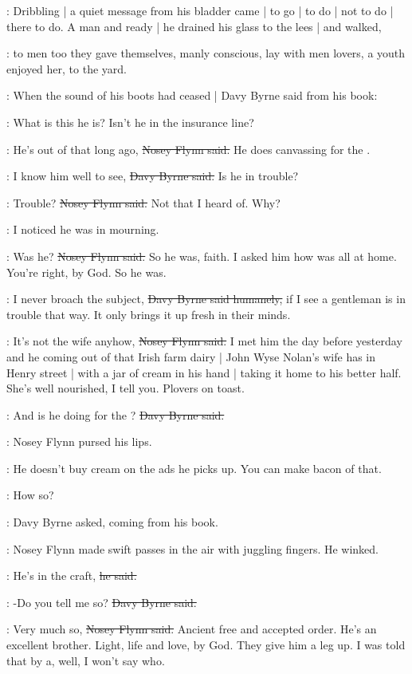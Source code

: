 :
Dribbling |
a quiet message from his bladder came |
to go |
to do |
not to do |
there to do.
A man and ready |
he drained his glass to the lees |
and walked,

:
to men too they gave themselves,
manly conscious,
lay with men lovers,
a youth enjoyed her,
to the yard.

:
When the sound of his boots had ceased |
Davy Byrne said from his book:

\davybyrne:
What is this he is?
Isn't he in the insurance line?

\nosey:
He's out of that long ago,
\sout{Nosey Flynn said.}
He does canvassing for the .

\davybyrne:
I know him well to see,
\sout{Davy Byrne said.}
Is he in trouble?

\nosey:
Trouble?
\sout{Nosey Flynn said.}
Not that I heard of.
Why?

\davybyrne:
I noticed he was in mourning.

\nosey:
Was he?
\sout{Nosey Flynn said.}
So he was, faith.
I asked him how was all at home.
You're right, by God.
So he was.

\davybyrne:
I never broach the subject,
\sout{Davy Byrne said humanely,}
if I see a gentleman is in trouble that way.
It only brings it up fresh in their minds.

\nosey:
It's not the wife anyhow,
\sout{Nosey Flynn said.}
I met him the day before yesterday
and he coming out of that Irish farm dairy |
John Wyse Nolan's wife has in Henry street |
with a jar of cream in his hand |
taking it home to his better half.
She's well nourished, I tell you.
Plovers on toast.

\davybyrne:
And is he doing for the ?
\sout{Davy Byrne said.}

:
Nosey Flynn pursed his lips.

\nosey:
He doesn't buy cream on the ads he picks up.
You can make bacon of that.

\davybyrne:
How so?

:
Davy Byrne asked,
coming from his book.

:
Nosey Flynn made swift passes in the air with juggling fingers.
He winked.

\nosey:
He's in the craft,
\sout{he said.}

\davybyrne:
-Do you tell me so?
\sout{Davy Byrne said.}

\nosey:
Very much so,
\sout{Nosey Flynn said.}
Ancient free and accepted order.
He's an excellent brother.
Light, life and love, by God.
They give him a leg up.
I was told that by a,
well,
I won't say who.

